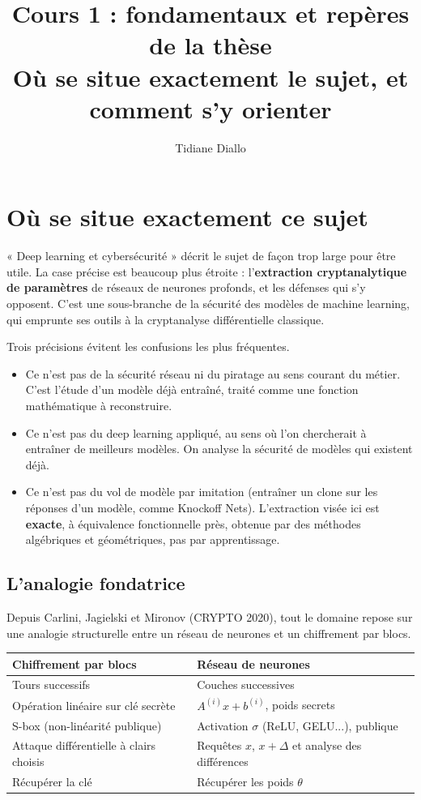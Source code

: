 \documentclass[11pt]{article}
\title{Cours 1 : fondamentaux et repères de la thèse\\[0.3em]\large Où se situe exactement le sujet, et comment s'y orienter}
\author{Tidiane Diallo}
\date{}
\begin{document}
\maketitle
\tableofcontents

\section{Où se situe exactement ce sujet}

« Deep learning et cybersécurité » décrit le sujet de façon trop large pour être utile. La case précise est beaucoup plus étroite : l'\textbf{extraction cryptanalytique de paramètres} de réseaux de neurones profonds, et les défenses qui s'y opposent. C'est une sous-branche de la sécurité des modèles de machine learning, qui emprunte ses outils à la cryptanalyse différentielle classique.

Trois précisions évitent les confusions les plus fréquentes.

\begin{itemize}
  \item Ce n'est pas de la sécurité réseau ni du piratage au sens courant du métier. C'est l'étude d'un modèle déjà entraîné, traité comme une fonction mathématique à reconstruire.
  \item Ce n'est pas du deep learning appliqué, au sens où l'on chercherait à entraîner de meilleurs modèles. On analyse la sécurité de modèles qui existent déjà.
  \item Ce n'est pas du vol de modèle par imitation (entraîner un clone sur les réponses d'un modèle, comme Knockoff Nets). L'extraction visée ici est \textbf{exacte}, à équivalence fonctionnelle près, obtenue par des méthodes algébriques et géométriques, pas par apprentissage.
\end{itemize}

\subsection{L'analogie fondatrice}

Depuis Carlini, Jagielski et Mironov (CRYPTO 2020), tout le domaine repose sur une analogie structurelle entre un réseau de neurones et un chiffrement par blocs.

\begin{table}[h]
\centering
\begin{tabular}{ll}
\toprule
Chiffrement par blocs & Réseau de neurones \\
\midrule
Tours successifs & Couches successives \\
Opération linéaire sur clé secrète & $A^{(i)}x + b^{(i)}$, poids secrets \\
S-box (non-linéarité publique) & Activation $\sigma$ (ReLU, GELU...), publique \\
Attaque différentielle à clairs choisis & Requêtes $x$, $x+\Delta$ et analyse des différences \\
Récupérer la clé & Récupérer les poids $\theta$ \\
\bottomrule
\end{tabular}
\end{table}
\end{document}
